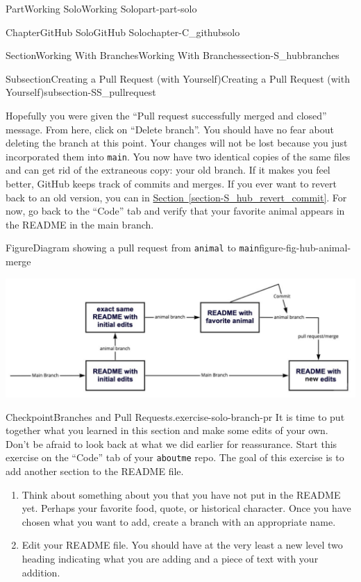 \documentclass[oneside,10pt,]{book}
\newcommand{\xreffont}{\relax}
\newcommand{\mono}[1]{\texttt{#1}}
\begin{document}
\begin{partptx}{Part}{Working Solo}{}{Working Solo}{}{}{part-part-solo}
\begin{chapterptx}{Chapter}{GitHub Solo}{}{GitHub Solo}{}{}{chapter-C_githubsolo}
\begin{sectionptx}{Section}{Working With Branches}{}{Working With Branches}{}{}{section-S_hubbranches}
\begin{subsectionptx}{Subsection}{Creating a Pull Request (with Yourself)}{}{Creating a Pull Request (with Yourself)}{}{}{subsection-SS_pullrequest}
\par
Hopefully you were given the ``Pull request successfully merged and closed'' message. From here, click on ``Delete branch''. You should have no fear about deleting the branch at this point. Your changes will not be lost because you just incorporated them into \mono{main}. You now have two identical copies of the same files and can get rid of the extraneous copy: your old branch. If it makes you feel better, GitHub keeps track of commits and merges. If you ever want to revert back to an old version, you can in \hyperref[section-S_hub_revert_commit]{Section~{\xreffont\ref{section-S_hub_revert_commit}}}. For now, go back to the ``Code'' tab and verify that your favorite animal appears in the README in the main branch.%
\begin{figureptx}{Figure}{Diagram showing a pull request from \mono{animal} to \mono{main}}{figure-fig-hub-animal-merge}{}%
\begin{image}{0.05}{0.9}{0.05}{}%
\includegraphics[width=\linewidth]{external/hub_animal_merge.pdf}
\end{image}%
\tcblower
\end{figureptx}%
\begin{inlineexercise}{Checkpoint}{Branches and Pull Requests.}{exercise-solo-branch-pr}%
It is time to put together what you learned in this section and make some edits of your own. Don't be afraid to look back at what we did earlier for reassurance. Start this exercise on the ``Code'' tab of your \mono{aboutme} repo. The goal of this exercise is to add another section to the README file.%
\begin{enumerate}[font=\bfseries,label=(\alph*),ref=\alph*]%
\item{}Think about something about you that you have not put in the README yet. Perhaps your favorite food, quote, or historical character. Once you have chosen what you want to add, create a branch with an appropriate name.%
\item{}Edit your README file. You should have at the very least a new level two heading indicating what you are adding and a piece of text with your addition.%

\end{enumerate}
\end{inlineexercise}
\end{subsectionptx}
\end{sectionptx}
\end{chapterptx}
\end{partptx}
\end{document}
